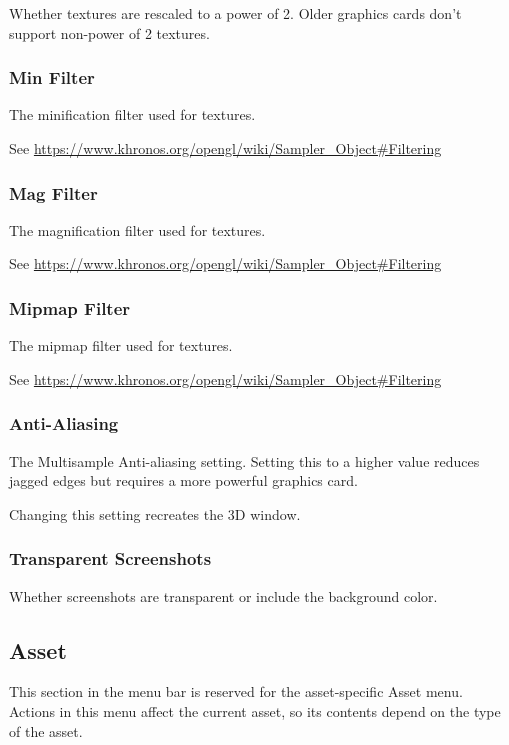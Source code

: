 \documentclass[10pt, a4paper, titlepage, oneside]{article}
\begin{document}
Whether textures are rescaled to a power of 2. Older graphics cards don't support non-power of 2 textures.

\subsubsection{Min Filter}

The minification filter used for textures.

\sloppy
See \url{https://www.khronos.org/opengl/wiki/Sampler_Object#Filtering}

\subsubsection{Mag Filter}

The magnification filter used for textures.

\sloppy
See \url{https://www.khronos.org/opengl/wiki/Sampler_Object#Filtering}

\subsubsection{Mipmap Filter}

The mipmap filter used for textures.

\sloppy
See \url{https://www.khronos.org/opengl/wiki/Sampler_Object#Filtering}

\subsubsection{Anti-Aliasing}

The Multisample Anti-aliasing setting. Setting this to a higher value reduces jagged edges but requires a more powerful graphics card.

 Changing this setting recreates the 3D window.
 
 \subsubsection{Transparent Screenshots}

Whether screenshots are transparent or include the background color.

\newpage

\subsection{Asset}

This section in the menu bar is reserved for the asset-specific Asset menu. Actions in this menu affect the current asset, so its contents depend on the type of the asset.
\end{document}
